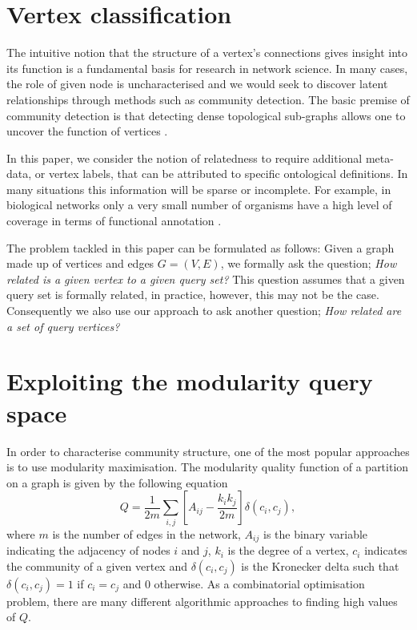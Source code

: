 \documentclass[manuscript, proceedings]{acmart}
\begin{document}
\section{Vertex classification}
The intuitive notion that the structure of a vertex's connections gives insight into its function is a fundamental basis for research in network science.
In many cases, the role of given node is uncharacterised and we would seek to discover latent relationships through methods such as community detection.
The basic premise of community detection is that detecting dense topological sub-graphs allows one to uncover the function of vertices \cite{}.

In this paper, we consider the notion of relatedness to require additional meta-data, or vertex labels, that can be attributed to specific ontological definitions.
In many situations this information will be sparse or incomplete.
For example, in biological networks only a very small number of organisms have a high level of coverage in terms of functional annotation \cite{}.

The problem tackled in this paper can be formulated as follows:
Given a graph made up of vertices and edges $G = (V, E)$, we formally ask the question; \textit{How related is a given vertex to a given query set?}
This question assumes that a given query set is formally related, in practice, however, this may not be the case.
Consequently we also use our approach to ask another question; \textit{ How related are a set of query vertices?}


\section{Exploiting the modularity query space}
In order to characterise community structure, one of the most popular approaches is to use modularity maximisation.
The modularity quality function of a partition on a graph is given by the following equation \cite{newman2004}
\begin{equation}\label{eq:modularity}
  Q = \frac{1}{2m}\sum_{i,j} \left[A_{ij} - \frac{k_i k_j}{2m}\right]\delta(c_i, c_j),
\end{equation}
where $m$ is the number of edges in the network, $A_{ij}$ is the binary variable indicating the adjacency of nodes $i$ and $j$, $k_i$ is the degree of a vertex, $c_i$ indicates the community of a given vertex and $\delta(c_i, c_j)$ is the Kronecker delta such that $\delta(c_i, c_j) = 1$ if $c_i = c_j$ and $0$ otherwise.
As a combinatorial optimisation problem, there are many different algorithmic approaches to finding high values of $Q$.
\end{document}
